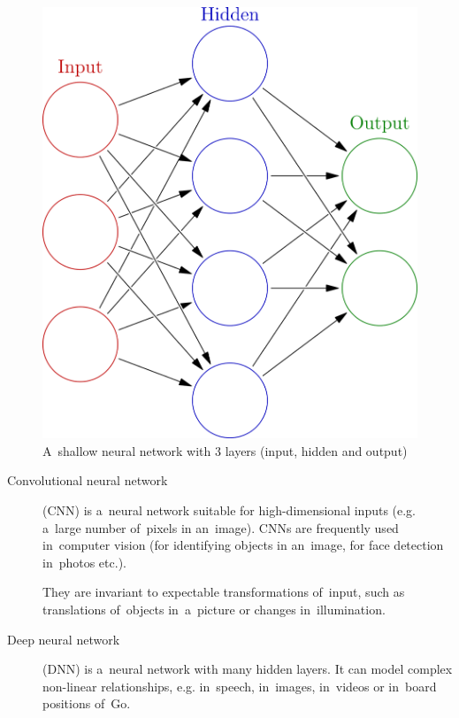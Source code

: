 \documentclass[a4paper,10pt]{article}
\begin{document}
\begin{figure}[H]
  \centering
  \includegraphics[height=.2\textheight]{../img/colored_neural_network.png}
  \caption{A~shallow neural network with 3 layers (input, hidden and output)}
  \label{fig:neural_network}
\end{figure}

\begin{description}
  \item [Convolutional neural network] (CNN) is a~neural network suitable for high-dimensional inputs (e.g. a~large number of~pixels in an~image).
    CNNs are frequently used in~computer vision (for identifying objects in an~image, for face detection in~photos etc.).

    They are invariant to expectable transformations of~input, such as translations of~objects in~a~picture or changes in~illumination.
  \item [Deep neural network] (DNN) is a~neural network with many hidden layers.
    It can model complex non-linear relationships, e.g. in~speech, in~images, in~videos or in~board positions of~Go.
\end{description}
\end{document}
